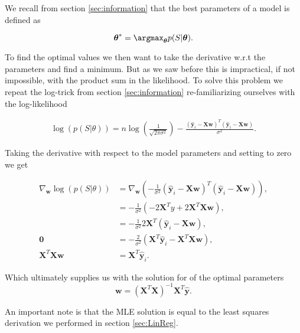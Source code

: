 \noindent We recall from section \ref{sec:information} that the best parameters of a model is defined as 

\begin{equation}
\boldsymbol{\theta}^* = \argmax_{\boldsymbol{\theta}} p(S|\boldsymbol{\theta}).
\end{equation}

\noindent To find the optimal values we then want to take the derivative w.r.t the parameters and find a minimum. But as we saw before this is impractical, if not impossible, with the product sum in the likelihood. To solve this problem we repeat the log-trick from section \ref{sec:information} re-familiarizing ourselves with the log-likelihood

\begin{align}
\log(p(S|\theta)) = n \log(\frac{1}{\sqrt{2\pi \sigma^2}}) - \frac{(\boldsymbol{\hat{y}}_i - \boldsymbol{X}\boldsymbol{w})^T(\boldsymbol{\hat{y}}_i - \boldsymbol{X}\boldsymbol{w})}{\sigma^2}.
\end{align}

\noindent Taking the derivative with respect to the model parameters and setting to zero we get

\begin{align*}
\nabla_{\boldsymbol{w}} \log(p(S|\theta)) &=\nabla_{\boldsymbol{w}}\left( - \frac{1}{\sigma^2} (\boldsymbol{\hat{y}}_i - \boldsymbol{X}\boldsymbol{w})^T(\boldsymbol{\hat{y}}_i - \boldsymbol{X}\boldsymbol{w}) \right),\\
&=  - \frac{1}{\sigma^2}(-2\boldsymbol{X}^Ty + 2\boldsymbol{X}^T\boldsymbol{X}\boldsymbol{w}),\\
&= -\frac{1}{\sigma^2} 2 \boldsymbol{X}^T(\boldsymbol{\hat{y}}_i- \boldsymbol{X}\boldsymbol{w}), \\
\boldsymbol{0} & = -\frac{2}{\sigma^2}(\boldsymbol{X}^T\boldsymbol{\hat{y}}_i - \boldsymbol{X}^T\boldsymbol{Xw}), \\
\boldsymbol{X}^T\boldsymbol{Xw} &= \boldsymbol{X}^T\boldsymbol{\hat{y}}_i .
\end{align*}

\noindent Which ultimately supplies us with the solution for of the optimal parameters 
\begin{equation}\label{eq:ls}
\boldsymbol{w}= (\boldsymbol{X}^T \boldsymbol{X})^{-1}\boldsymbol{X}^T\boldsymbol{\hat{y}}.
\end{equation}


\noindent An important note is that the MLE solution is equal to the least squares derivation we performed in section \ref{sec:LinReg}. 
